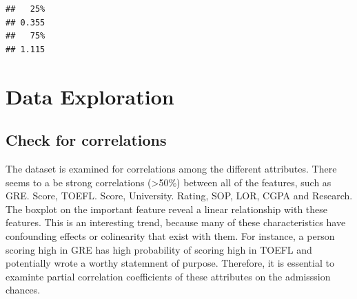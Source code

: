 \documentclass[11pt,]{article}
\newenvironment{Shaded}{\begin{snugshade}}{\end{snugshade}}
\newcommand{\ControlFlowTok}[1]{\textcolor[rgb]{0.13,0.29,0.53}{\textbf{#1}}}
\newcommand{\FloatTok}[1]{\textcolor[rgb]{0.00,0.00,0.81}{#1}}
\newcommand{\KeywordTok}[1]{\textcolor[rgb]{0.13,0.29,0.53}{\textbf{#1}}}
\newcommand{\NormalTok}[1]{#1}
\newcommand{\OperatorTok}[1]{\textcolor[rgb]{0.81,0.36,0.00}{\textbf{#1}}}
\newcommand{\StringTok}[1]{\textcolor[rgb]{0.31,0.60,0.02}{#1}}
\begin{document}
\begin{Shaded}
\end{Shaded}

\begin{verbatim}
##   25% 
## 0.355 
##   75% 
## 1.115
\end{verbatim}

\hypertarget{data-exploration}{%
\section{Data Exploration}\label{data-exploration}}

\hypertarget{check-for-correlations}{%
\subsection{Check for correlations}\label{check-for-correlations}}

The dataset is examined for correlations among the different attributes.
There seems to a be strong correlations (\textgreater{}50\%) between all
of the features, such as GRE. Score, TOEFL. Score, University. Rating,
SOP, LOR, CGPA and Research. The boxplot on the important feature reveal
a linear relationship with these features. This is an interesting trend,
because many of these characteristics have confounding effects or
colinearity that exist with them. For instance, a person scoring high in
GRE has high probability of scoring high in TOEFL and potentially wrote
a worthy statemnent of purpose. Therefore, it is essential to examinte
partial correlation coefficients of these attributes on the admisssion
chances.
\end{document}
